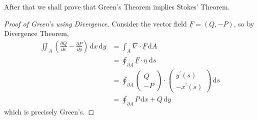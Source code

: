 After that we shall prove that Green's Theorem implies Stokes' Theorem.
\begin{proof}[Proof of Green's using Divergence]
    Consider the vector field $\underline{F}=(Q,-P)$, so by Divergence Theorem,
    \begin{align*}
        \iint_A\left( \frac{\partial Q}{\partial x}-\frac{\partial P}{\partial y} \right)\,\mathrm dx\,\mathrm dy
        &=\int_A\nabla\cdot\underline{F}\,\mathrm dA\\
        &=\oint_{\partial A}\underline{F}\cdot\underline{n}\,\mathrm ds\\
        &=\oint_{\partial A}\begin{pmatrix}
            Q\\
            -P
        \end{pmatrix}\cdot\begin{pmatrix}
            y^\prime(s)\\
            -x^\prime(s)
        \end{pmatrix}\,\mathrm ds\\
        &=\oint_{\partial A}P\,\mathrm dx+Q\,\mathrm dy
    \end{align*}
    which is precisely Green's.
\end{proof}
